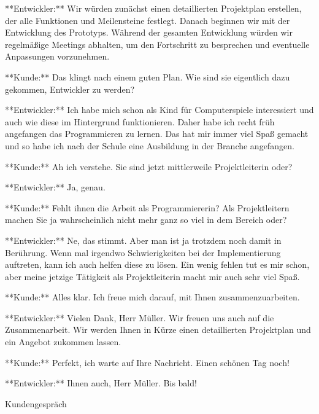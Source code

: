\begin{prompt}[H]
    \begin{tcolorbox}[colback=gray!20, colframe=gray!20, boxrule=0pt, sharp corners] 
        **Entwickler:** Wir würden zunächst einen detaillierten Projektplan erstellen, der alle Funktionen und Meilensteine festlegt. Danach beginnen wir mit der Entwicklung des Prototyps. Während der gesamten Entwicklung würden wir regelmäßige Meetings abhalten, um den Fortschritt zu besprechen und eventuelle Anpassungen vorzunehmen.
        
        **Kunde:** Das klingt nach einem guten Plan. Wie sind sie eigentlich dazu gekommen, Entwickler zu werden?
        
        **Entwickler:** Ich habe mich schon als Kind für Computerspiele interessiert und auch wie diese im Hintergrund funktionieren. Daher habe ich recht früh angefangen das Programmieren zu lernen. Das hat mir immer viel Spaß gemacht und so habe ich nach der Schule eine Ausbildung in der Branche angefangen.
        
        **Kunde:** Ah ich verstehe. Sie sind jetzt mittlerweile Projektleiterin oder?
        
        **Entwickler:** Ja, genau.
        
        **Kunde:** Fehlt ihnen die Arbeit als Programmiererin? Als Projektleitern machen Sie ja wahrscheinlich nicht mehr ganz so viel in dem Bereich oder?
        
        **Entwickler:** Ne, das stimmt. Aber man ist ja trotzdem noch damit in Berührung. Wenn mal irgendwo Schwierigkeiten bei der Implementierung auftreten, kann ich auch helfen diese zu lösen. Ein wenig fehlen tut es mir schon, aber meine jetzige Tätigkeit als Projektleiterin macht mir auch sehr viel Spaß.
        
        **Kunde:** Alles klar. Ich freue mich darauf, mit Ihnen zusammenzuarbeiten.
        
        **Entwickler:** Vielen Dank, Herr Müller. Wir freuen uns auch auf die Zusammenarbeit. Wir werden Ihnen in Kürze einen detaillierten Projektplan und ein Angebot zukommen lassen.
        
        **Kunde:** Perfekt, ich warte auf Ihre Nachricht. Einen schönen Tag noch!
        
        **Entwickler:** Ihnen auch, Herr Müller. Bis bald!
        \vfill
    \end{tcolorbox}
    \caption{Kundengespräch}
    \label{Kundengespräch2}
\end{prompt}

